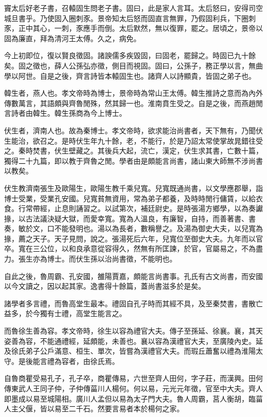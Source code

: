 竇太后好老子書，召轅固生問老子書。固曰，此是家人言耳。太后怒曰，安得司空城旦書乎。乃使固入圈刺豕。景帝知太后怒而固直言無罪，乃假固利兵，下圈刺豕，正中其心，一刺，豕應手而倒。太后默然，無以復罪，罷之。居頃之，景帝以固為廉直，拜為清河王太傅。久之，病免。

今上初即位，復以賢良徵固。諸諛儒多疾毀固，曰固老，罷歸之。時固已九十餘矣。固之徵也，薛人公孫弘亦徵，側目而視固。固曰，公孫子，務正學以言，無曲學以阿世。自是之後，齊言詩皆本轅固生也。諸齊人以詩顯貴，皆固之弟子也。

韓生者，燕人也。孝文帝時為博士，景帝時為常山王太傅。韓生推詩之意而為內外傳數萬言，其語頗與齊魯閒殊，然其歸一也。淮南賁生受之。自是之後，而燕趙閒言詩者由韓生。韓生孫商為今上博士。

伏生者，濟南人也。故為秦博士。孝文帝時，欲求能治尚書者，天下無有，乃聞伏生能治，欲召之。是時伏生年九十餘，老，不能行，於是乃詔太常使掌故晁錯往受之。秦時焚書，伏生壁藏之。其後兵大起，流亡，漢定，伏生求其書，亡數十篇，獨得二十九篇，即以教于齊魯之閒。學者由是頗能言尚書，諸山東大師無不涉尚書以教矣。

伏生教濟南張生及歐陽生，歐陽生教千乘兒寬。兒寬既通尚書，以文學應郡舉，詣博士受業，受業孔安國。兒寬貧無資用，常為弟子都養，及時時閒行傭賃，以給衣食。行常帶經，止息則誦習之。以試第次，補廷尉史。是時張湯方鄉學，以為奏讞掾，以古法議決疑大獄，而愛幸寬。寬為人溫良，有廉智，自持，而善著書、書奏，敏於文，口不能發明也。湯以為長者，數稱譽之。及湯為御史大夫，以兒寬為掾，薦之天子。天子見問，說之。張湯死后六年，兒寬位至御史大夫。九年而以官卒。寬在三公位，以和良承意從容得久，然無有所匡諫，於官，官屬易之，不為盡力。張生亦為博士。而伏生孫以治尚書徵，不能明也。

自此之後，魯周霸、孔安國，雒陽賈嘉，頗能言尚書事。孔氏有古文尚書，而安國以今文讀之，因以起其家。逸書得十餘篇，蓋尚書滋多於是矣。

諸學者多言禮，而魯高堂生最本。禮固自孔子時而其經不具，及至秦焚書，書散亡益多，於今獨有士禮，高堂生能言之。

而魯徐生善為容。孝文帝時，徐生以容為禮官大夫。傳子至孫延、徐襄。襄，其天姿善為容，不能通禮經，延頗能，未善也。襄以容為漢禮官大夫，至廣陵內史。延及徐氏弟子公戶滿意、桓生、單次，皆嘗為漢禮官大夫。而瑕丘蕭奮以禮為淮陽太守。是後能言禮為容者，由徐氏焉。

自魯商瞿受易孔子，孔子卒，商瞿傳易，六世至齊人田何，字子莊，而漢興。田何傳東武人王同子仲，子仲傳菑川人楊何。何以易，元光元年徵，官至中大夫。齊人即墨成以易至城陽相。廣川人孟但以易為太子門大夫。魯人周霸，莒人衡胡，臨菑人主父偃，皆以易至二千石。然要言易者本於楊何之家。

